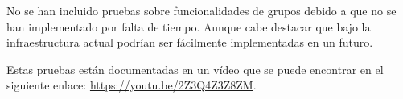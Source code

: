 No se han incluido pruebas sobre funcionalidades de grupos debido a que no se han implementado por falta de tiempo. Aunque cabe destacar que bajo la 
infraestructura actual podrían ser fácilmente implementadas en un futuro.

Estas pruebas están documentadas en un vídeo que se puede encontrar en el siguiente enlace: \url{https://youtu.be/2Z3Q4Z3Z8ZM}.